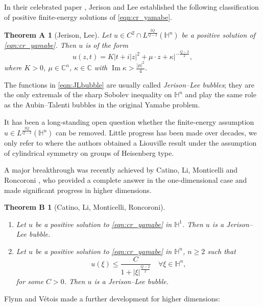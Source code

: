 \documentclass[reqno]{amsart}
\newtheorem*{thma}{Theorem A}
\newtheorem*{thmb}{Theorem B}
\theoremstyle{definition}
\theoremstyle{remark}
\numberwithin{equation}{section}
\begin{document}
In their celebrated paper \cite{JL88}, Jerison and Lee established the following classification of positive finite-energy solutions of \eqref{eqn:cr_yamabe}.

\begin{thma}[Jerison, Lee] \label{thm:JL}
Let $u \in C^2 \cap L^{\frac{2Q}{Q-2}}(\mathbb{H}^n)$ be a positive solution of \eqref{eqn:cr_yamabe}. Then
$u$ is of the form
\begin{equation}\label{eqn:JLbubble}
u(z,t) = K\bigl| t + i|z|^2 + \mu \cdot z + \kappa \bigr|^{-\frac{Q-2}{2}},
\end{equation}
where $K>0$, $\mu\in\mathbb{C}^n$, $\kappa\in\mathbb{C}$ with $\operatorname{Im}\kappa > \frac {|\mu|^2}{4}$.
\end{thma}

The functions in \eqref{eqn:JLbubble} are usually called \emph{Jerison–Lee bubbles}; they are the only extremals of 
the sharp Sobolev inequality on $\mathbb{H}^n$ and play the same role as the Aubin–Talenti bubbles in the original 
Yamabe problem. 

It has been a long‑standing open question whether the finite-energy assumption $u \in L^{\frac{2Q}{Q-2}}(\mathbb{H}^n)$
can be removed. Little progress has been made over decades, we only refer to \cite{GV01} where the authors 
obtained a Liouville result under the assumption of cylindrical symmetry on groups of Heisenberg type.

A major breakthrough was recently achieved by Catino, Li, Monticelli and Roncoroni \cite{CLMR23}, who provided a 
complete answer in the one-dimensional case and made significant progress in higher dimensions.

\begin{thmb}[Catino, Li, Monticelli, Roncoroni] \label{thm:CLMR}
\begin{enumerate}
\item[(i)] Let $u$ be a positive solution to \eqref{eqn:cr_yamabe} in $\mathbb{H}^1$. Then $u$ is a Jerison–Lee bubble.
\item[(ii)] Let $u$ be a positive solution to \eqref{eqn:cr_yamabe} in $\mathbb{H}^n$, $n\geq 2$ such that
\[
u(\xi)\leq\frac{C}{1+|\xi|^\frac{Q-2}{2}}\quad\forall\xi\in \mathbb{H}^n,
\]
for some $C>0$. Then $u$ is a Jerison–Lee bubble.
\end{enumerate}
\end{thmb}

Flynn and V\'etois \cite{FV23} made a further development for higher dimensions:
\end{document}
